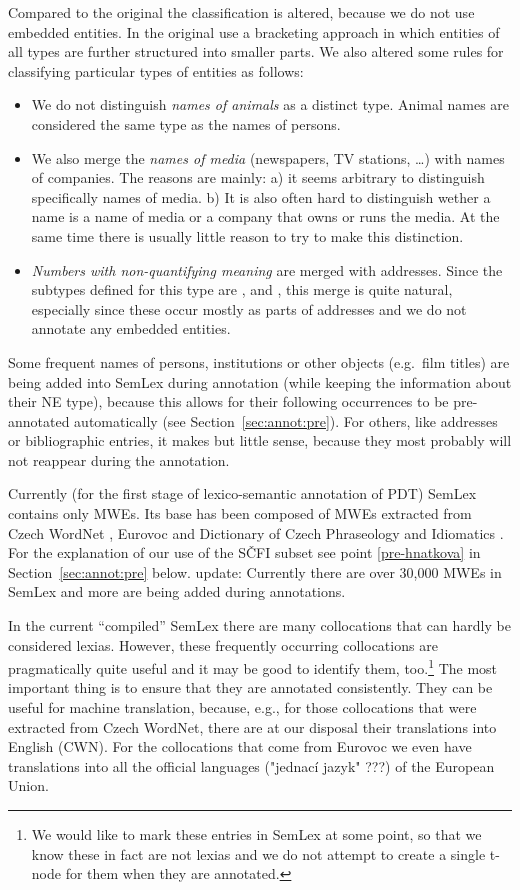 Compared to the original the classification is altered, because we do not use embedded entities. In the original \citeauthor{sevcikova:2007} use a bracketing approach in which entities of all types are further structured into smaller parts. We also altered some rules for classifying particular types of entities as follows:
\begin{itemize}
\item  We do not distinguish \emph{names of animals} as a distinct type. Animal names are considered the same type as the names of persons.
\item We also merge the \emph{names of media} (newspapers, TV stations, \ldots) with names of companies. The reasons are mainly: a) it seems arbitrary to distinguish specifically names of media. b) It is also often hard to distinguish wether a name is a name of media or a company that owns or runs the media. At the same time there is usually little reason to try to make this distinction.
\item \emph{Numbers with non-quantifying meaning} are merged with addresses. Since the subtypes defined for this type are ,  and , this merge is quite natural, especially since these occur mostly as parts of addresses and we do not annotate any embedded entities.
\end{itemize}

Some frequent names of persons, institutions or other objects (e.g.~film titles) are being added into SemLex during annotation (while keeping the information about their NE type), because this allows for their following occurrences to be pre-annotated automatically (see Section~\ref{sec:annot:pre}). For others, like addresses or bibliographic entries, it makes but little sense, because they most probably will not reappear during the annotation. 

Currently (for the first stage of lexico-semantic annotation of PDT) SemLex contains only MWEs. Its base has been composed of MWEs extracted from Czech WordNet \citep{smrz:03}, Eurovoc \citep{eurovoc:07} and Dictionary of Czech Phraseology and Idiomatics \citep{cermak:1988}.%
For the explanation of our use of the SČFI subset see point \ref{pre-hnatkova} in Section~\ref{sec:annot:pre} below. 
{\xxx update: Currently there are over 30,000 MWEs in SemLex and more are being added during annotations.}

{\xxx In the current ``compiled'' SemLex there are many collocations that can hardly be considered lexias. However, these frequently occurring collocations are pragmatically quite useful and it may be good to identify them, too.\footnote{We would like to mark these entries in SemLex at some point, so that we know these in fact are not lexias and we do not attempt to create a single t-node for them when they are annotated.} The most important thing is to ensure that they are annotated consistently. They can be useful for machine translation, because, e.g., for those collocations that were extracted from Czech WordNet, there are at our disposal their translations into English (CWN). For the collocations that come from Eurovoc we even have translations into all the official languages ("jednací jazyk" ???) of the European Union.}

